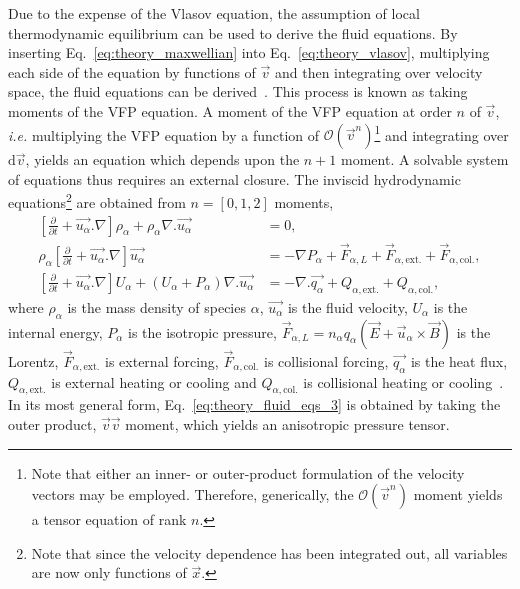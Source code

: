 Due to the expense of the Vlasov equation, the assumption of local thermodynamic equilibrium can be used to derive the fluid equations.
By inserting Eq.~\ref{eq:theory_maxwellian} into Eq.~\ref{eq:theory_vlasov}, multiplying each side of the equation by functions of $\vec{v}$ and then integrating over velocity space, the fluid equations can be derived~\cite{chen_introduction_2018}.
This process is known as taking moments of the \ac{VFP} equation.
A moment of the \ac{VFP} equation at order $n$ of $\vec{v}$, \textit{i.e.} multiplying the \ac{VFP} equation by a function of $\mathcal{O}(\vec{v}^n)$\footnote{Note that either an inner- or outer-product formulation of the velocity vectors may be employed. Therefore, generically, the $\mathcal{O}(\vec{v}^n)$ moment yields a tensor equation of rank $n$.} and integrating over $\text{d}\vec{v}$, yields an equation which depends upon the $n+1$ moment.
A solvable system of equations thus requires an external closure.
The inviscid hydrodynamic equations\footnote{Note that since the velocity dependence has been integrated out, all variables are now only functions of $\vec{x}$.} are obtained from $n=[0,1,2]$ moments,
\begin{align}
    \label{eq:theory_fluid_eqs_1}
    \left [ \frac{\partial}{\partial t} + \vec{u_\alpha}.\nabla \right ] \rho_\alpha + \rho_\alpha\nabla . \vec{u_\alpha} &= 0,\\
    \label{eq:theory_fluid_eqs_2}
    \rho_\alpha \left [ \frac{\partial}{\partial t} + \vec{u_\alpha}.\nabla \right ] \vec{u_\alpha} &= -\nabla P_\alpha + \vec{F}_{\alpha,L} + \vec{F}_{\alpha,\text{ext.}} + \vec{F}_{\alpha,\text{col.}},\\
    \label{eq:theory_fluid_eqs_3}
    \left [ \frac{\partial}{\partial t} + \vec{u_\alpha}.\nabla \right ] U_\alpha + (U_\alpha + P_\alpha)\nabla.\vec{u_\alpha} &= -\nabla . \vec{q_\alpha} + Q_{\alpha,\text{ext.}} + Q_{\alpha,\text{col.}},
\end{align}
where $\rho_\alpha$ is the mass density of species $\alpha$, $\vec{u_\alpha}$ is the fluid velocity, $U_\alpha$ is the internal energy, $P_\alpha$ is the isotropic pressure, $\vec{F}_{\alpha,L} = n_\alpha q_\alpha (\vec{E} + \vec{u}_\alpha \times \vec{B})$ is the Lorentz, $\vec{F}_{\alpha,\text{ext.}}$ is external forcing, $\vec{F}_{\alpha,\text{col.}}$ is collisional forcing, $\vec{q_\alpha}$ is the heat flux, $Q_{\alpha,\text{ext.}}$ is external heating or cooling and $Q_{\alpha,\text{col.}}$ is collisional heating or cooling~\cite{castor_radiation_2004}.
In its most general form, Eq.~\ref{eq:theory_fluid_eqs_3} is obtained by taking the outer product, $\vec{v}\vec{v}$ moment, which yields an anisotropic pressure tensor.

